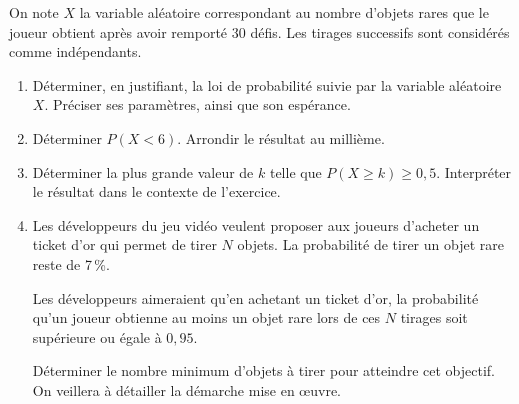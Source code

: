 On note $X$ la variable aléatoire correspondant au nombre d'objets rares que le joueur obtient après avoir remporté $30$ défis. Les tirages successifs sont considérés comme indépendants.

\medskip

\begin{enumerate}
\item Déterminer, en justifiant, la loi de probabilité suivie par la variable aléatoire $X$. Préciser ses paramètres, ainsi que son espérance.
\item Déterminer $P(X < 6)$. Arrondir le résultat au millième.
\item Déterminer la plus grande valeur de $k$ telle que $P(X \geqslant k) \geqslant 0,5$. Interpréter le résultat dans le contexte de l'exercice.
\item Les développeurs du jeu vidéo veulent proposer aux joueurs d'acheter un \og ticket
d'or \fg{} qui permet de tirer $N$ objets. La probabilité de tirer un objet rare reste de 7\,\%.

Les développeurs aimeraient qu'en achetant un ticket d'or, la probabilité qu'un joueur obtienne au moins un objet rare lors de ces $N$ tirages soit supérieure ou égale à $0,95$.

Déterminer le nombre minimum d'objets à tirer pour atteindre cet objectif. On veillera à détailler la démarche mise en œuvre.
\end{enumerate}


